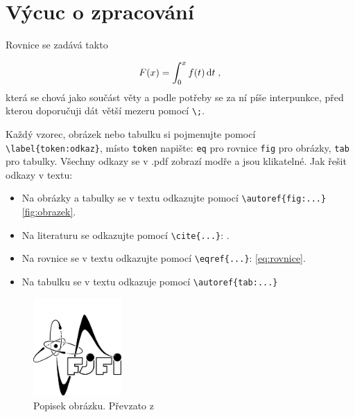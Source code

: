 \section*{Výcuc o zpracování}
Rovnice se zadává takto

\begin{equation}
	F(x) = \int_{0}^{x} f(t) \operatorname{d}\!{t} \;,
	\label{eq:rovnice}
\end{equation}
která se chová jako součást věty a podle potřeby se za ní píše interpunkce, před kterou doporučuji dát větší mezeru pomocí \verb|\;|. 


Každý vzorec, obrázek nebo tabulku si pojmenujte pomocí \verb|\label{token:odkaz}|, místo \verb|token| napište: \verb|eq| pro rovnice \verb|fig| pro obrázky, \verb|tab| pro tabulky. Všechny odkazy se v .pdf zobrazí modře a jsou klikatelné.  Jak řešit odkazy v textu:
\begin{itemize}
	\item Na obrázky a tabulky se v textu odkazujte pomocí \verb|\autoref{fig:...}| \autoref{fig:obrazek}.
	
	\item Na literaturu se odkazujte pomocí \verb|\cite{...}|: \cite{Tabulky}.
	
	\item Na rovnice se v textu odkazujte pomocí \verb|\eqref{...}|: \eqref{eq:rovnice}.
	
	\item Na tabulku se v textu odkazuje pomocí \verb|\autoref{tab:...}|
	
\end{itemize}			


\begin{figure}[!hbt] %
	\centering
	\includegraphics[width=0.3\textwidth]{img/fjfi} %
	\caption{Popisek obrázku. Převzato z \cite{bib:zadani}} %
	\label{fig:obrazek} %
\end{figure}			

